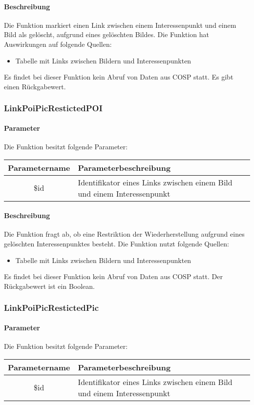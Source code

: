 \paragraph{Beschreibung} Die Funktion markiert einen Link zwischen einem Interessenpunkt und einem Bild als gelöscht, aufgrund eines gelöschten Bildes. Die Funktion hat Auswirkungen auf folgende Quellen:
\begin{itemize}
	\item Tabelle mit Links zwischen Bildern und Interessenpunkten
\end{itemize}
Es findet bei dieser Funktion kein Abruf von Daten aus {\glqq COSP\grqq} statt. Es gibt einen Rückgabewert.
\subsubsection{LinkPoiPicRestictedPOI}
\paragraph{Parameter} Die Funktion besitzt folgende Parameter:
\begin{table}[H]
	\begin{tabular}{|c|p{11cm}|}
		\hline
		\textbf{Parametername} & \textbf{Parameterbeschreibung} \\ \hline
		\$id    & Identifikator eines Links zwischen einem Bild und einem Interessenpunkt \\ \hline
	\end{tabular}
\end{table}
\paragraph{Beschreibung} Die Funktion fragt ab, ob eine Restriktion der Wiederherstellung aufgrund eines gelöschten Interessenpunktes besteht. Die Funktion nutzt folgende Quellen:
\begin{itemize}
	\item Tabelle mit Links zwischen Bildern und Interessenpunkten
\end{itemize}
Es findet bei dieser Funktion kein Abruf von Daten aus {\glqq COSP\grqq} statt. Der Rückgabewert ist ein Boolean.
\subsubsection{LinkPoiPicRestictedPic}
\paragraph{Parameter} Die Funktion besitzt folgende Parameter:
\begin{table}[H]
	\begin{tabular}{|c|p{11cm}|}
		\hline
		\textbf{Parametername} & \textbf{Parameterbeschreibung} \\ \hline
		\$id    & Identifikator eines Links zwischen einem Bild und einem Interessenpunkt \\ \hline
	\end{tabular}
\end{table}
